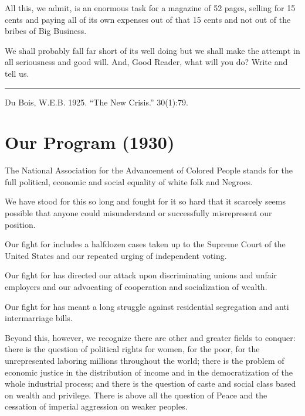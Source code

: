 \documentclass[letterpaper,10pt,english]{jupyterBook}
\begin{document}
\sphinxAtStartPar
All this, we admit, is an enormous task for a magazine of 52 pages, selling for 15 cents and paying all of its own expenses out of that 15 cents and not out of the bribes of Big Business.

\sphinxAtStartPar
We shall probably fall far short of its well doing but we shall make the attempt in all seriousness and good will. And, Good Reader, what will you do? Write and tell us.


\bigskip\hrule\bigskip


\sphinxAtStartPar
{} Du Bois, W.E.B. 1925. “The New Crisis.”   30(1):7\sphinxhyphen{}9.


\section{Our Program (1930)}
\label{\detokenize{Volumes/37/05/our_program:our-program-1930}}\label{\detokenize{Volumes/37/05/our_program::doc}}
\sphinxAtStartPar
The National Association for the Advancement of Colored People stands for the full political, economic and social equality of white folk and Negroes.

\sphinxAtStartPar
We have stood for this so long and fought for it so hard that it scarcely seems possible that anyone could misunderstand or successfully misrepresent our position.

\sphinxAtStartPar
Our fight for  includes a half\sphinxhyphen{}dozen cases taken up to the Supreme Court of the United States and our repeated urging of independent voting.

\sphinxAtStartPar
Our fight for  has directed our attack upon discriminating unions and unfair employers and our advocating of co\sphinxhyphen{}operation and socialization of wealth.

\sphinxAtStartPar
Our fight for  has meant a long struggle against residential segregation and anti inter\sphinxhyphen{}marriage bills.

\sphinxAtStartPar
Beyond this, however, we recognize there are other and greater fields to conquer: there is the question of political rights for women, for the poor, for the unrepresented laboring millions throughout the world; there is the problem of economic justice in the distribution of income and in the democratization of the whole industrial process; and there is the question of caste and social class based on wealth and privilege. There is above all the question of Peace and the cessation of imperial aggression on weaker peoples.
\end{document}
